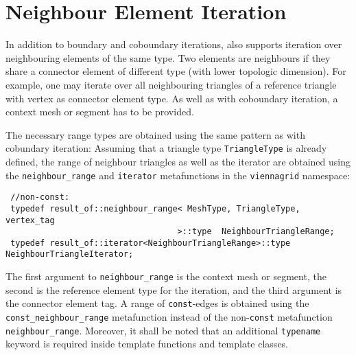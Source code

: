 \section{Neighbour Element Iteration}
In addition to boundary and coboundary iterations, {\ViennaGridversion} also supports iteration over neighbouring elements of the same type.
Two elements are neighbours if they share a connector element of different type (with lower topologic dimension).
For example, one may iterate over all neighbouring triangles of a reference triangle with vertex as connector element type.
As well as with coboundary iteration, a context mesh or segment has to be provided.


The necessary range types are obtained using the same pattern as with cobundary iteration:
Assuming that a triangle type \lstinline|TriangleType| is already defined, the range of neighbour triangles as well as the iterator are obtained
using the \lstinline|neighbour_range| and \lstinline|iterator| metafunctions in the \lstinline|viennagrid| namespace:
\begin{lstlisting}
 //non-const:
 typedef result_of::neighbour_range< MeshType, TriangleType, vertex_tag
                                   >::type  NeighbourTriangleRange;
 typedef result_of::iterator<NeighbourTriangleRange>::type   NeighbourTriangleIterator;
\end{lstlisting}
The first argument to \lstinline|neighbour_range| is the context mesh or segment, the second is the reference element type for the iteration, and the third argument is the connector element tag.
A range of \lstinline|const|-edges is obtained using the \lstinline|const_neighbour_range| metafunction instead of the non-\lstinline|const| metafunction \lstinline|neighbour_range|.
Moreover, it shall be noted that an additional \lstinline|typename| keyword is required inside template functions and template classes.

